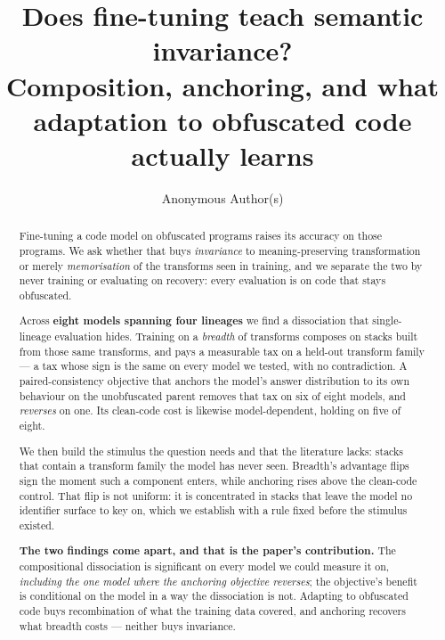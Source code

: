 \documentclass[sigconf,review,anonymous]{acmart}
\begin{document}
\title{Does fine-tuning teach semantic invariance?\\
       Composition, anchoring, and what adaptation to obfuscated code actually learns}

\author{Anonymous Author(s)}

\begin{abstract}
Fine-tuning a code model on obfuscated programs raises its accuracy on those programs. We ask
whether that buys \emph{invariance} to meaning-preserving transformation or merely
\emph{memorisation} of the transforms seen in training, and we separate the two by never training
or evaluating on recovery: every evaluation is on code that stays obfuscated.

Across \textbf{eight models spanning four lineages} we find a dissociation that single-lineage
evaluation hides. Training on a \emph{breadth} of transforms composes on stacks built from those
same transforms, and pays a measurable tax on a held-out transform family --- a tax whose sign is
the same on every model we tested, with no contradiction. A paired-consistency objective that
anchors the model's answer distribution to its own behaviour on the unobfuscated parent removes
that tax on six of eight models, and \emph{reverses} on one. Its clean-code cost is likewise
model-dependent, holding on five of eight.

We then build the stimulus the question needs and that the literature lacks: stacks that contain a
transform family the model has never seen. Breadth's advantage flips sign the moment such a
component enters, while anchoring rises above the clean-code control. That flip is not uniform:
it is concentrated in stacks that leave the model no identifier surface to key on, which we
establish with a rule fixed before the stimulus existed.

\textbf{The two findings come apart, and that is the paper's contribution.} The compositional
dissociation is significant on every model we could measure it on, \emph{including the one model
where the anchoring objective reverses}; the objective's benefit is conditional on the model in a
way the dissociation is not. Adapting to obfuscated code buys recombination of what the training
data covered, and anchoring recovers what breadth costs --- neither buys invariance.
\end{abstract}

\maketitle
\end{document}
